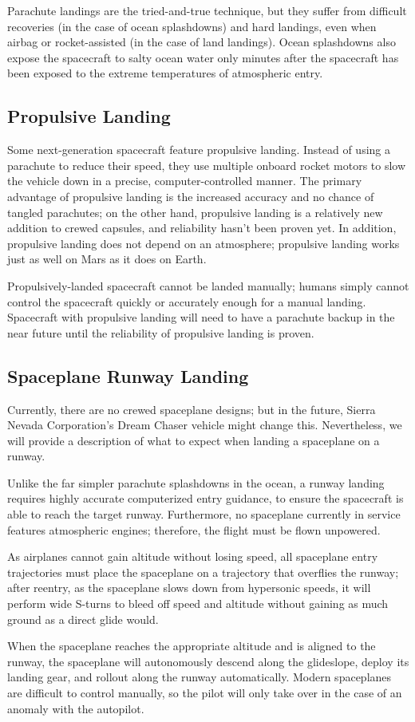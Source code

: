 Parachute landings are the tried-and-true technique, but they suffer
from difficult recoveries (in the case of ocean splashdowns) and hard
landings, even when airbag or rocket-assisted (in the case of land
landings). Ocean splashdowns also expose the spacecraft to salty ocean
water only minutes after the spacecraft has been exposed to the
extreme temperatures of atmospheric entry.

\subsection{Propulsive Landing}

Some next-generation spacecraft feature propulsive landing. Instead of
using a parachute to reduce their speed, they use multiple onboard
rocket motors to slow the vehicle down in a precise,
computer-controlled manner. The primary advantage of propulsive
landing is the increased accuracy and no chance of tangled parachutes;
on the other hand, propulsive landing is a relatively new addition to
crewed capsules, and reliability hasn't been proven yet. In addition,
propulsive landing does not depend on an atmosphere; propulsive
landing works just as well on Mars as it does on Earth.

Propulsively-landed spacecraft cannot be landed manually; humans
simply cannot control the spacecraft quickly or accurately enough for
a manual landing. Spacecraft with propulsive landing will need to have
a parachute backup in the near future until the reliability of
propulsive landing is proven.

\subsection{Spaceplane Runway Landing}

Currently, there are no crewed spaceplane designs; but in the future,
Sierra Nevada Corporation's {Dream Chaser} vehicle might change
this. Nevertheless, we will provide a description of what to expect
when landing a spaceplane on a runway.

Unlike the far simpler parachute splashdowns in the ocean, a runway
landing requires highly accurate computerized entry guidance, to
ensure the spacecraft is able to reach the target runway. Furthermore,
no spaceplane currently in service features atmospheric engines;
therefore, the flight must be flown unpowered.

As airplanes cannot gain altitude without losing speed, all spaceplane
entry trajectories must place the spaceplane on a trajectory that
overflies the runway; after reentry, as the spaceplane slows down from
hypersonic speeds, it will perform wide S-turns to bleed off speed and
altitude without gaining as much ground as a direct glide would.

When the spaceplane reaches the appropriate altitude and is aligned to
the runway, the spaceplane will autonomously descend along the
glideslope, deploy its landing gear, and rollout along the runway
automatically. Modern spaceplanes are difficult to control manually,
so the pilot will only take over in the case of an anomaly with the
autopilot.
